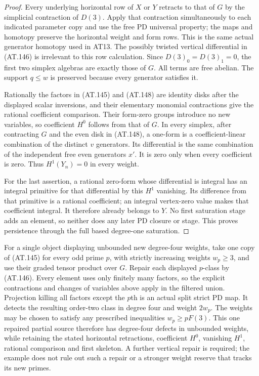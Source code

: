 \begin{proof}
Every underlying horizontal row of $X$ or $Y$ retracts
to that of $G$ by the simplicial contraction of $D(3)$.
Apply that contraction simultaneously to each indicated
parameter copy and use the free PD universal property;
the maps and homotopy preserve the horizontal weight
and form rows. This is the same actual generator
homotopy used in AT13.
The possibly twisted vertical differential in (AT.146)
is irrelevant to this row calculation.
Since $D(3)_0=D(3)_1=0$, the first two simplex algebras
are exactly those of $G$.
All terms are free abelian. The support $q\leq w$ is
preserved because every generator satisfies it.

Rationally the factors in (AT.145) and (AT.148) are
identity disks after the displayed scalar inversions,
and their elementary monomial contractions give the
rational coefficient comparison.
Their form-zero groups introduce no new variables,
so coefficient $H^0$ follows from that of $G$.
In every simplex, after contracting $G$ and the even
disk in (AT.148), a one-form is a coefficient-linear
combination of the distinct $v$ generators.
Its differential is the same combination of the
independent free even generators $x'$.
It is zero only when every coefficient is zero.
Thus $H^1(Y_n)=0$ in every weight.

For the last assertion, a rational zero-form whose
differential is integral has an integral primitive
for that differential by this $H^1$ vanishing.
Its difference from that primitive is a rational
coefficient; an integral vertex-zero value makes
that coefficient integral.
It therefore already belongs to $Y$.
No first saturation stage adds an element, so neither
does any later PD closure or stage.
This proves persistence through the full based
degree-one saturation.
\end{proof}

For a single object displaying unbounded new degree-four
weights, take one copy of (AT.145) for every odd prime $p$,
with strictly increasing weights $w_p\geq3$, and use their
graded tensor product over $G$.
Repair each displayed $p$-class by (AT.146).
Every element uses only finitely many factors, so the
explicit contractions and changes of variables above
apply in the filtered union.
Projection killing all factors except the $p$th is an
actual split strict PD map.
It detects the resulting order-two class in degree four
and weight $2w_p$.
The weights may be chosen to satisfy any prescribed
inequalities $w_p\geq pF(3)$.
This one repaired partial source therefore has degree-four
defects in unbounded weights, while retaining the stated
horizontal retractions, coefficient $H^0$, vanishing $H^1$,
rational comparison and first skeleton.
A further vertical repair is required; the example
does not rule out such a repair or a stronger weight
reserve that tracks its new primes.

